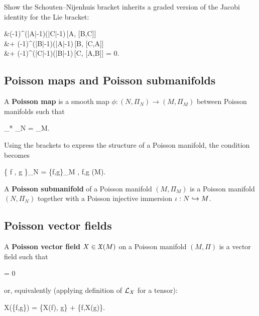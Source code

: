 \documentclass[main.tex]{subfiles}
\begin{document}
\begin{exercise}
\label{ex:graded_jacobi}
	Show the Schouten--Nijenhuis bracket inherits a graded version of the Jacobi identity for the Lie bracket:
	\begin{eqalign}
		&(-1)^{(|A|-1)(|C|-1)}\,[A, [B,C]]\\
			&\qquad \qquad + (-1)^{(|B|-1)(|A|-1)}\,[B, [C,A]]\\
				&\qquad \qquad \qquad \qquad + (-1)^{(|C|-1)(|B|-1)}\,[C, [A,B]] = 0.
	\end{eqalign}
\end{exercise}

\subsection{Poisson maps and Poisson submanifolds}
\begin{definition}
	A \textbf{Poisson map} is a smooth map $\phi : (N, \Pi_N) \to (M, \Pi_M)$ between Poisson manifolds such that
	\begin{eqalign}
	\label{eq:poisson_map_condition}
		\phi_* \Pi_N = \Pi_M.
	\end{eqalign}
\end{definition}

Using the brackets to express the structure of a Poisson manifold, the condition becomes
\begin{eqalign}
	\{ f \circ \phi, g \circ \phi \}_N = \{f,g\}_M \circ \phi, \quad \forall f,g \in \Cinfty(M).
\end{eqalign}

\begin{definition}
	A \textbf{Poisson submanifold} of a Poisson manifold $(M, \Pi_M)$ is a Poisson manifold $(N, \Pi_N)$ together with a Poisson injective immersion $\iota: N \hookrightarrow M$.
\end{definition}

\subsection{Poisson vector fields}

\begin{definition}
	A \textbf{Poisson vector field} $X \in \mathfrak{X}(M)$ on a Poisson manifold $(M, \Pi)$ is a vector field such that
	\begin{eqalign}
		 \Pi = 0
	\end{eqalign}
	or, equivalently (applying definition of $\mathcal{L}_{X}$ for a tensor):
	\begin{eqalign}
		X(\{f,g\}) = \{X(f), g\} + \{f,X(g)\}.
	\end{eqalign}
\end{definition}
\end{document}
